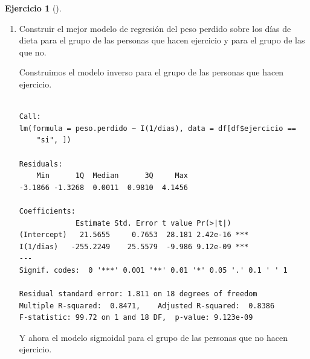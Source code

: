 \documentclass[
  a4paper,
]{scrreport}
\newenvironment{Shaded}{\begin{snugshade}}{\end{snugshade}}
\newcommand{\DecValTok}[1]{\textcolor[rgb]{0.68,0.00,0.00}{#1}}
\newcommand{\FunctionTok}[1]{\textcolor[rgb]{0.28,0.35,0.67}{#1}}
\newcommand{\NormalTok}[1]{\textcolor[rgb]{0.00,0.23,0.31}{#1}}
\newcommand{\OtherTok}[1]{\textcolor[rgb]{0.00,0.23,0.31}{#1}}
\newcommand{\SpecialCharTok}[1]{\textcolor[rgb]{0.37,0.37,0.37}{#1}}
\newcommand{\StringTok}[1]{\textcolor[rgb]{0.13,0.47,0.30}{#1}}
\theoremstyle{definition}
\newtheorem{exercise}{Ejercicio}[chapter]
\theoremstyle{remark}
\begin{document}
\begin{exercise}[]
\begin{enumerate}
\begin{tcolorbox}
  \end{tcolorbox}
\item
  Construir el mejor modelo de regresión del peso perdido sobre los días
  de dieta para el grupo de las personas que hacen ejercicio y para el
  grupo de las que no.

  \begin{tcolorbox}[enhanced jigsaw, toprule=.15mm, rightrule=.15mm, arc=.35mm, colback=white, colbacktitle=quarto-callout-tip-color!10!white, toptitle=1mm, left=2mm, colframe=quarto-callout-tip-color-frame, opacityback=0, breakable, opacitybacktitle=0.6, bottomtitle=1mm, titlerule=0mm, title=\textcolor{quarto-callout-tip-color}{\faLightbulb}\hspace{0.5em}{Solución}, bottomrule=.15mm, coltitle=black, leftrule=.75mm]

  Construimos el modelo inverso para el grupo de las personas que hacen
  ejercicio.

\begin{Shaded}
\end{Shaded}

\begin{verbatim}

Call:
lm(formula = peso.perdido ~ I(1/dias), data = df[df$ejercicio == 
    "si", ])

Residuals:
    Min      1Q  Median      3Q     Max 
-3.1866 -1.3268  0.0011  0.9810  4.1456 

Coefficients:
             Estimate Std. Error t value Pr(>|t|)    
(Intercept)   21.5655     0.7653  28.181 2.42e-16 ***
I(1/dias)   -255.2249    25.5579  -9.986 9.12e-09 ***
---
Signif. codes:  0 '***' 0.001 '**' 0.01 '*' 0.05 '.' 0.1 ' ' 1

Residual standard error: 1.811 on 18 degrees of freedom
Multiple R-squared:  0.8471,    Adjusted R-squared:  0.8386 
F-statistic: 99.72 on 1 and 18 DF,  p-value: 9.123e-09
\end{verbatim}

  Y ahora el modelo sigmoidal para el grupo de las personas que no hacen
  ejercicio.


\end{tcolorbox}
\end{enumerate}
\end{exercise}
\end{document}
